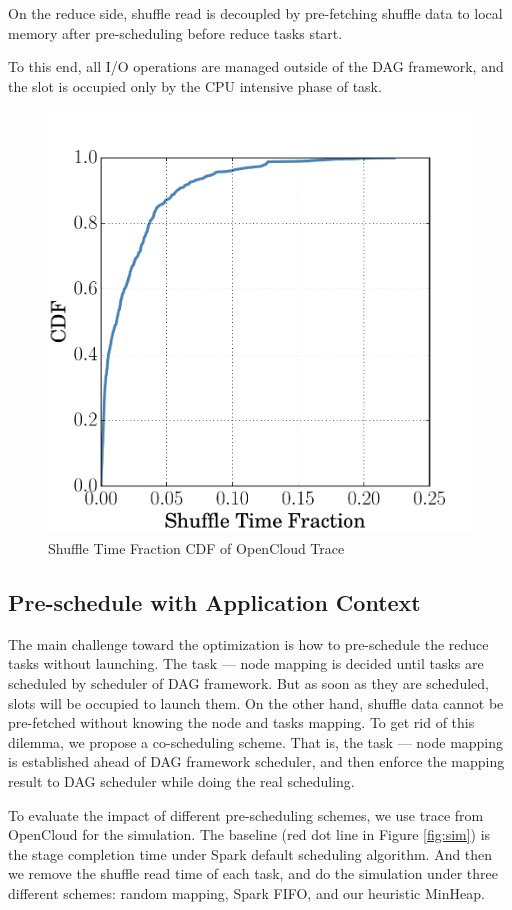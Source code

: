 On the reduce side, shuffle read is decoupled by pre-fetching shuffle data to local memory after pre-scheduling before reduce tasks start.

To this end, all I/O operations are managed outside of the DAG framework, and the slot is occupied only by the CPU intensive phase of task.
\begin{figure}
	\centering
	\includegraphics[width=0.75\linewidth]{fig/reduce_cdf}
	\caption{Shuffle Time Fraction CDF of OpenCloud Trace}
	\label{fig:cdf}
\end{figure}
\subsection{Pre-schedule with Application Context}
The main challenge toward the optimization is how to pre-schedule the reduce tasks without launching. The task --- node mapping is decided until tasks are scheduled by scheduler of DAG framework. But as soon as they are scheduled, slots will be occupied to launch them. On the other hand, shuffle data cannot be pre-fetched without knowing the node and tasks mapping.
To get rid of this dilemma, we propose a co-scheduling scheme. That is, the task --- node mapping is established ahead of DAG framework scheduler, and then enforce the mapping result to DAG scheduler while doing the real scheduling.

To evaluate the impact of different pre-scheduling schemes, we use trace from OpenCloud \cite{opencloudtrace} for the simulation. The baseline (red dot line in Figure \ref{fig:sim}) is the stage completion time under Spark default scheduling algorithm. And then we remove the shuffle read time of each task, and do the simulation under three different schemes: random mapping, Spark FIFO, and our heuristic MinHeap.

